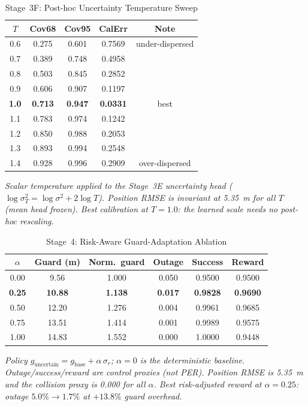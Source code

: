
\begin{table}[htbp]
\footnotesize
\setlength{\tabcolsep}{4pt}
\centering
\caption{\label{tab:tempsweep}Stage~3F: Post-hoc Uncertainty Temperature Sweep}
\begin{tabular}{ccccc}
\toprule
$T$ & Cov68 & Cov95 & CalErr & Note \\
\midrule
0.6 & 0.275 & 0.601 & 0.7569 & under-dispersed \\
0.7 & 0.389 & 0.748 & 0.4958 & \\
0.8 & 0.503 & 0.845 & 0.2852 & \\
0.9 & 0.606 & 0.907 & 0.1197 & \\
\textbf{1.0} & \textbf{0.713} & \textbf{0.947} & \textbf{0.0331} & best \\
1.1 & 0.783 & 0.974 & 0.1242 & \\
1.2 & 0.850 & 0.988 & 0.2053 & \\
1.3 & 0.893 & 0.994 & 0.2548 & \\
1.4 & 0.928 & 0.996 & 0.2909 & over-dispersed \\
\bottomrule
\end{tabular}
\par\vspace{2pt}\raggedright\footnotesize\textit{Scalar temperature applied to the Stage~3E uncertainty head ($\log\sigma^2_T=\log\sigma^2+2\log T$). Position RMSE is invariant at 5.35~m for all $T$ (mean head frozen). Best calibration at $T{=}1.0$: the learned scale needs no post-hoc rescaling.}
\end{table}

\begin{table}[htbp]
\footnotesize
\setlength{\tabcolsep}{4pt}
\centering
\caption{\label{tab:risk}Stage~4: Risk-Aware Guard-Adaptation Ablation}
\begin{tabular}{cccccc}
\toprule
$\alpha$ & Guard (m) & Norm.\ guard & Outage & Success & Reward \\
\midrule
0.00 & 9.56  & 1.000 & 0.050 & 0.9500 & 0.9500 \\
\textbf{0.25} & \textbf{10.88} & \textbf{1.138} & \textbf{0.017} & \textbf{0.9828} & \textbf{0.9690} \\
0.50 & 12.20 & 1.276 & 0.004 & 0.9961 & 0.9685 \\
0.75 & 13.51 & 1.414 & 0.001 & 0.9989 & 0.9575 \\
1.00 & 14.83 & 1.552 & 0.000 & 1.0000 & 0.9448 \\
\bottomrule
\end{tabular}
\par\vspace{2pt}\raggedright\footnotesize\textit{Policy $g_{\text{uncertain}}=g_{\text{base}}+\alpha\,\sigma_r$; $\alpha{=}0$ is the deterministic baseline. Outage/success/reward are control proxies (not PER). Position RMSE is 5.35~m and the collision proxy is 0.000 for all $\alpha$. Best risk-adjusted reward at $\alpha{=}0.25$: outage $5.0\%\!\to\!1.7\%$ at $+13.8\%$ guard overhead.}
\end{table}
